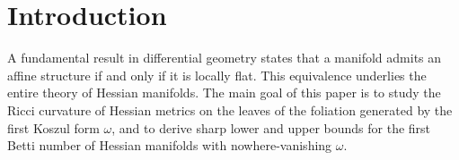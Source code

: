 \section{Introduction}

A fundamental result in differential geometry states that a manifold admits an 
affine structure if and only if it is locally flat. This equivalence underlies 
the entire theory of Hessian manifolds. The main goal of this paper is to study 
the Ricci curvature of Hessian metrics on the leaves of the foliation generated 
by the first Koszul form $\omega$, and to derive sharp lower and upper bounds 
for the first Betti number of Hessian manifolds with nowhere-vanishing $\omega$.